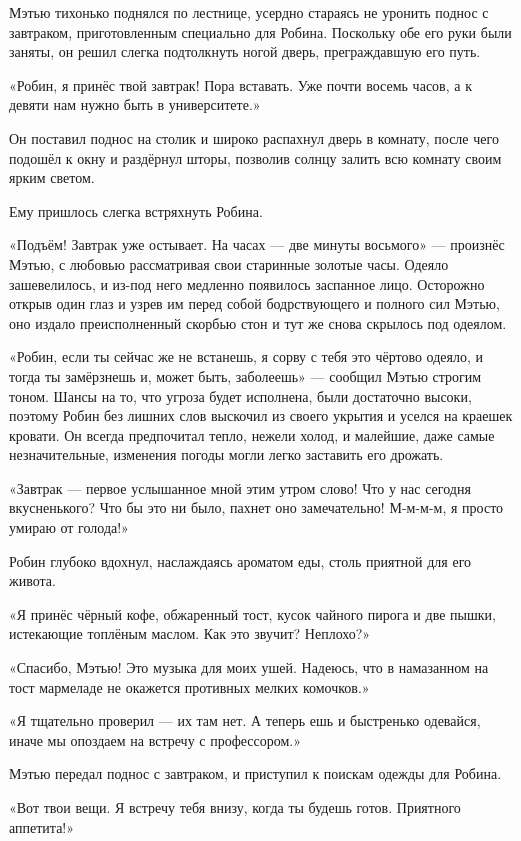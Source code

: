 \documentclass[a5paper, 9pt,
final, openany, twoside=true]{memoir}
\begin{document}
Мэтью тихонько поднялся по лестнице, усердно стараясь не уронить поднос с завтраком, приготовленным специально для Робина. Поскольку обе его руки были заняты, он решил слегка подтолкнуть ногой дверь, преграждавшую его путь.

«Робин, я принёс твой завтрак! Пора вставать. Уже почти восемь часов, а к девяти нам нужно быть в университете.»

Он поставил поднос на столик и широко распахнул дверь в комнату, после чего подошёл к окну и раздёрнул шторы, позволив солнцу залить всю комнату своим ярким светом.

Ему пришлось слегка встряхнуть Робина.

«Подъём! Завтрак уже остывает. На часах — две минуты восьмого» — произнёс Мэтью, с любовью рассматривая свои старинные золотые часы. Одеяло зашевелилось, и из-под него медленно появилось заспанное лицо. Осторожно открыв один глаз и узрев им перед собой бодрствующего и полного сил Мэтью, оно издало преисполненный скорбью стон и тут же снова скрылось под одеялом.

«Робин, если ты сейчас же не встанешь, я сорву с тебя это чёртово одеяло, и тогда ты замёрзнешь и, может быть, заболеешь» — сообщил Мэтью строгим тоном. Шансы на то, что угроза будет исполнена, были достаточно высоки, поэтому Робин без лишних слов выскочил из своего укрытия и уселся на краешек кровати. Он всегда предпочитал тепло, нежели холод, и малейшие, даже самые незначительные, изменения погоды могли легко заставить его дрожать.

«Завтрак — первое услышанное мной этим утром слово! Что у нас сегодня вкусненького? Что бы это ни было, пахнет оно замечательно! М-м-м-м, я просто умираю от голода!»

Робин глубоко вдохнул, наслаждаясь ароматом еды, столь приятной для его живота.

«Я принёс чёрный кофе, обжаренный тост, кусок чайного пирога и две пышки, истекающие топлёным маслом. Как это звучит? Неплохо?»

«Спасибо, Мэтью! Это музыка для моих ушей. Надеюсь, что в намазанном на тост мармеладе не окажется противных мелких комочков.»

«Я тщательно проверил — их там нет. А теперь ешь и быстренько одевайся, иначе мы опоздаем на встречу с профессором.»

Мэтью передал поднос с завтраком, и приступил к поискам одежды для Робина.

«Вот твои вещи. Я встречу тебя внизу, когда ты будешь готов. Приятного аппетита!»
\end{document}
